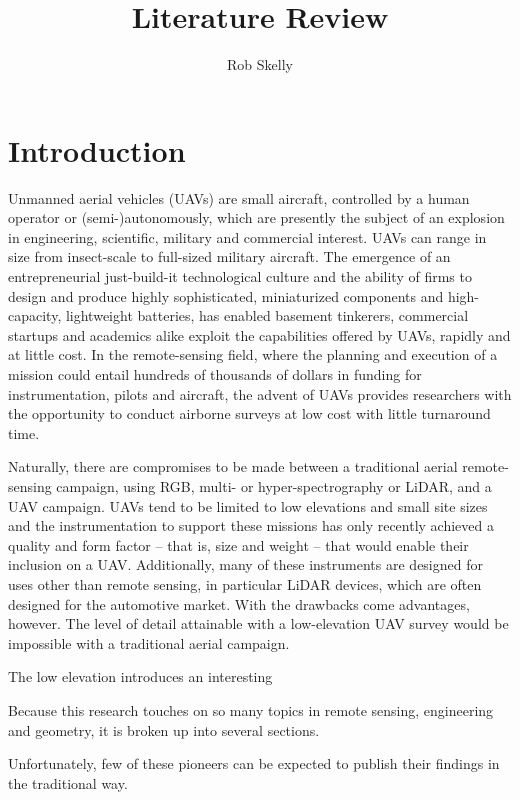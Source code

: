 \documentclass[10pt]{article}
\author{Rob Skelly}
\title{Literature Review}
\begin{document}
\maketitle

\section{Introduction}

Unmanned aerial vehicles (UAVs) are small aircraft, controlled by a human operator or (semi-)autonomously, which are presently the subject of an explosion in engineering, scientific, military and commercial interest. UAVs can range in size from insect-scale to full-sized military aircraft. The emergence of an entrepreneurial just-build-it technological culture and the ability of firms to design and produce highly sophisticated, miniaturized components and high-capacity, lightweight batteries, has enabled basement tinkerers, commercial startups and academics alike exploit the capabilities offered by UAVs, rapidly and at little cost. In the remote-sensing field, where the planning and execution of a mission could entail hundreds of thousands of dollars in funding for instrumentation, pilots and aircraft, the advent of UAVs provides researchers with the opportunity to conduct airborne surveys at low cost with little turnaround time. 

Naturally, there are compromises to be made between a traditional aerial remote-sensing campaign, using RGB, multi- or hyper-spectrography or LiDAR, and a UAV campaign. UAVs tend to be limited to low elevations and small site sizes and the instrumentation to support these missions has only recently achieved a quality and form factor -- that is, size and weight -- that would enable their inclusion on a UAV. Additionally, many of these instruments are designed for uses other than remote sensing, in particular LiDAR devices, which are often designed for the automotive market. With the drawbacks come advantages, however. The level of detail attainable with a low-elevation UAV survey would be impossible with a traditional aerial campaign.

The low elevation introduces an interesting 

Because this research touches on so many topics in remote sensing, engineering and geometry, it is broken up into several sections.



Unfortunately, few of these pioneers can be expected to publish their findings in the traditional way.
\end{document}
